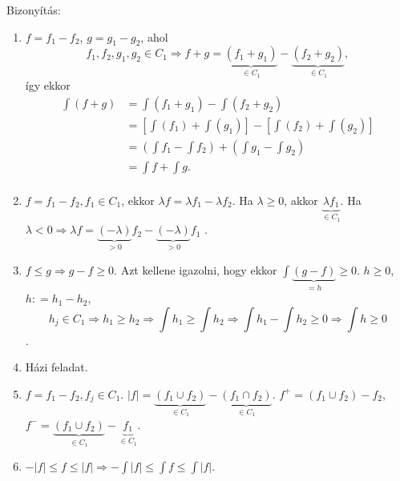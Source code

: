 \documentclass[12pt,a4paper]{scrartcl}
\providecommand{\tightlist}{%
  \setlength{\itemsep}{0pt}\setlength{\parskip}{0pt}}
\newenvironment{bizonyitas}{}{}
\begin{document}
\begin{bizonyitas}

Bizonyítás:

\begin{enumerate}
\def\labelenumi{\arabic{enumi}.}
\tightlist
\item
  \(f = f_{1} - f_{2}\), \(g = g_{1} - g_{2}\), ahol
  \[{f_1},{f_2},{g_1},{g_2} \in {C_1} \Rightarrow f + g = \underbrace {\left( {{f_1} + {g_1}} \right)}_{ \in {C_1}} - \underbrace {\left( {{f_2} + {g_2}} \right)}_{ \in {C_1}},\]
  így ekkor \[\begin{aligned}
    \int {\left( {f + g} \right)}  &  = \int {\left( {{f_1} + {g_1}} \right)}  - \int {\left( {{f_2} + {g_2}} \right)}  \\ 
     &  = \left[ {\int {\left( {{f_1}} \right)}  + \int {\left( {{g_1}} \right)} } \right] - \left[ {\int {\left( {{f_2}} \right)}  + \int {\left( {{g_2}} \right)} } \right] \\ 
     &  = \left( {\int {{f_1}}  - \int {{f_2}} } \right) + \left( {\int {{g_1}}  - \int {{g_2}} } \right) \\ 
     &  = \int f  + \int g . \\ 
  \end{aligned} \]
\item
  \(f = f_{1} - f_{2},f_{1} \in C_{1}\), ekkor
  \(\lambda f = \lambda f_{1} - \lambda f_{2}\). Ha \(\lambda \geq 0\),
  akkor \({\underbrace {\lambda {f_1}}_{ \in {C_1}}}\). Ha
  \(\lambda <0 \Rightarrow \lambda f = \underbrace {\left( { - \lambda } \right)}_{ > 0}{f_2} - \underbrace {\left( { - \lambda } \right)}_{ > 0}{f_1}\)
  .
\item
  \(\left. f \leq g\Rightarrow g - f \geq 0 \right.\). Azt kellene
  igazolni, hogy ekkor
  \(\int {\underbrace {\left( {g - f} \right)}_{ = h}} \geqslant 0\).
  \(h \geq 0\), \(h: = h_{1} - h_{2}\),
  \[\left. h_{j} \in C_{1}\Rightarrow h_{1} \geq h_{2}\Rightarrow{\int h_{1}} \geq {\int h_{2}}\Rightarrow{\int h_{1}} - {\int h_{2}} \geq 0\Rightarrow{\int h} \geq 0 \right.\].
\item
  Házi feladat.
\item
  \(f = f_{1} - f_{2},f_{j} \in C_{1}\).
  \(\left| f \right| = \underbrace {\left( {{f_1} \cup {f_2}} \right)}_{ \in {C_1}} - \underbrace {\left( {{f_1} \cap {f_2}} \right)}_{ \in {C_1}}\).
  \(f^{+} = \left( {f_{1} \cup f_{2}} \right) - f_{2}\),
  \({f^ - } = \underbrace {\left( {{f_1} \cup {f_2}} \right)}_{ \in {C_1}} - \underbrace {{f_1}}_{ \in {C_1}}.\)
\item
  \(\left. - \left| f \right| \leq f \leq \left| f \right|\Rightarrow - {\int{\left| f \right| \leq {\int f}}} \leq {\int\left| f \right|} \right.\).

\end{enumerate}
\end{bizonyitas}
\end{document}
